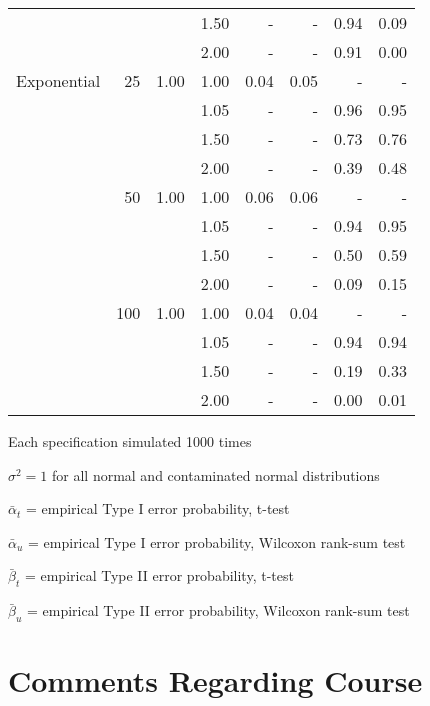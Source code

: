 \documentclass{report}
\begin{document}
\begin{table}[h!]
\begin{threeparttable}
\begin{tabular}{|l r r r r r r r|}
			&  & & 1.50 & - & - & 0.94 & 0.09 \\ 
			&  & & 2.00 & - & - & 0.91 & 0.00 \\ 
			Exponential &  25 & 1.00 & 1.00 & 0.04 & 0.05 & - & - \\ 
			&   & & 1.05 & - & - & 0.96 & 0.95 \\ 
			&   & & 1.50 & - & - & 0.73 & 0.76 \\ 
			&   & & 2.00 & - & - & 0.39 & 0.48 \\ 
			&  50 & 1.00 & 1.00 & 0.06 & 0.06 & - & - \\ 
			&   & & 1.05 & - & - & 0.94 & 0.95 \\ 
			&   & & 1.50 & - & - & 0.50 & 0.59 \\ 
			&   & & 2.00 & - & - & 0.09 & 0.15 \\ 
			& 100 & 1.00 & 1.00 & 0.04 & 0.04 & - & - \\ 
			&  & & 1.05 & - & - & 0.94 & 0.94 \\ 
			&  & & 1.50 & - & - & 0.19 & 0.33 \\ 
			&  & & 2.00 & - & - & 0.00 & 0.01 \\ 

			\hline
		\end{tabular}
		\begin{tablenotes}
		\item Each specification simulated 1000 times
		\item $\sigma^2 = 1$ for all normal and contaminated normal
			distributions
		\item $\bar{\alpha}_t$ = empirical Type I error probability, t-test
		\item $\bar{\alpha}_u$ = empirical Type I error probability,
			Wilcoxon rank-sum test
		\item $\bar{\beta}_t$ = empirical Type II error probability, t-test
		\item $\bar{\beta}_u$ = empirical Type II error probability, Wilcoxon rank-sum test
		\end{tablenotes}
	\end{threeparttable}
\end{table}

\clearpage
\section*{Comments Regarding Course}
\end{document}
